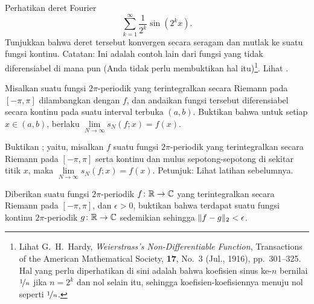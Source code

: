 \begin{exercise} \label{exercise:fsweierser}
Perhatikan deret Fourier
\begin{equation*}
\sum_{k=1}^\infty \frac{1}{2^k} \sin(2^k x) .
\end{equation*}
Tunjukkan bahwa deret tersebut konvergen secara seragam dan mutlak ke suatu
fungsi kontinu.  Catatan: Ini adalah contoh lain dari fungsi yang tidak
diferensiabel di mana pun (Anda tidak perlu membuktikan hal itu)\footnote{%
Lihat
G.\ H.\ Hardy, \emph{Weierstrass's Non-Differentiable Function},
Transactions of the American Mathematical Society,
\textbf{17}, No.\ 3 (Jul., 1916), pp.\ 301--325.
Hal yang perlu diperhatikan di sini adalah bahwa koefisien sinus ke-$n$
bernilai $\nicefrac{1}{n}$ jika $n=2^k$ dan nol selain itu, sehingga
koefisien-koefisiennya menuju nol seperti $\nicefrac{1}{n}$.}.
Lihat .
\begin{myfigureht}
\caption{Grafik 
$\sum_{n=1}^\infty \frac{1}{2^n} \sin(2^n x)$.\label{fig:fourierserweier}}
\end{myfigureht}
\end{exercise}

\begin{exercise}
Misalkan suatu fungsi $2\pi$-periodik yang terintegralkan secara Riemann
pada $[-\pi,\pi]$ dilambangkan dengan $f$, dan andaikan fungsi tersebut diferensiabel secara kontinu
pada suatu interval terbuka $(a,b)$.  Buktikan bahwa
untuk setiap $x \in (a,b)$, berlaku $\lim\limits_{N\to\infty} s_N(f;x) = f(x)$.
\end{exercise}

\begin{exercise}
Buktikan ; yaitu, misalkan $f$ suatu fungsi
$2\pi$-periodik yang terintegralkan secara Riemann pada $[-\pi,\pi]$ serta kontinu dan mulus
sepotong-sepotong di sekitar titik $x$, maka $\lim\limits_{N\to\infty} s_N(f;x) = f(x)$.
Petunjuk: Lihat latihan sebelumnya.
\end{exercise}

\begin{exercise} \label{exercise:contL2close}
Diberikan suatu fungsi $2\pi$-periodik $f \colon {\mathbb{R}} \to {\mathbb{C}}$ yang terintegralkan secara Riemann pada
$[-\pi,\pi]$,
dan $\epsilon > 0$,
buktikan bahwa terdapat suatu fungsi kontinu $2\pi$-periodik $g \colon {\mathbb{R}}
\to {\mathbb{C}}$ sedemikian sehingga $\lVert {f-g} \rVert_2 < \epsilon$.
\end{exercise}

